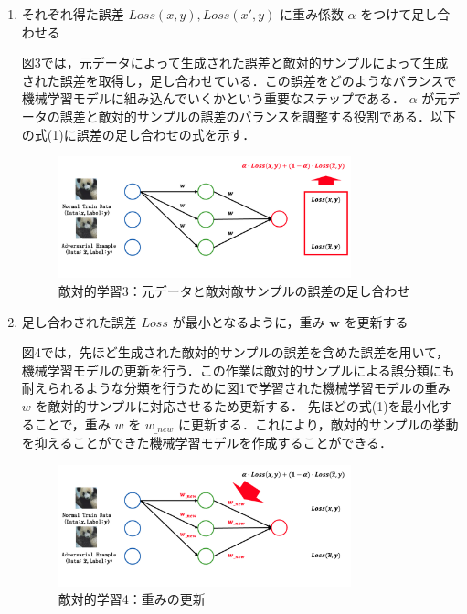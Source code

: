 \begin{enumerate}
    \item それぞれ得た誤差 $Loss(x, y), Loss(x', y)$ に重み係数 $\alpha$ をつけて足し合わせる

    図3では，元データによって生成された誤差と敵対的サンプルによって生成された誤差を取得し，足し合わせている．この誤差をどのようなバランスで機械学習モデルに組み込んでいくかという重要なステップである． $\alpha$ が元データの誤差と敵対的サンプルの誤差のバランスを調整する役割である．以下の式(1)に誤差の足し合わせの式を示す．
    \begin{figure}[H]
        \centering
        \includegraphics[width=0.8\textwidth]{images/敵対的学習3.png}
        \caption{敵対的学習3：元データと敵対敵サンプルの誤差の足し合わせ}
        \label{fig:adversarial_learning3}
    \end{figure}

    \item 足し合わされた誤差 $Loss$ が最小となるように，重み $\bm{w}$ を更新する

    図4では，先ほど生成された敵対的サンプルの誤差を含めた誤差を用いて，機械学習モデルの更新を行う．この作業は敵対的サンプルによる誤分類にも耐えられるような分類を行うために図1で学習された機械学習モデルの重み $w$ を敵対的サンプルに対応させるため更新する．
    先ほどの式(1)を最小化することで，重み $w$ を $w_{\_new}$ に更新する．これにより，敵対的サンプルの挙動を抑えることができた機械学習モデルを作成することができる．
    
    \begin{figure}[H]
        \centering
        \includegraphics[width=0.8\textwidth]{images/敵対的学習4.png}
        \caption{敵対的学習4：重みの更新}
        \label{fig:adversarial_learning4}
    \end{figure}

\end{enumerate}

